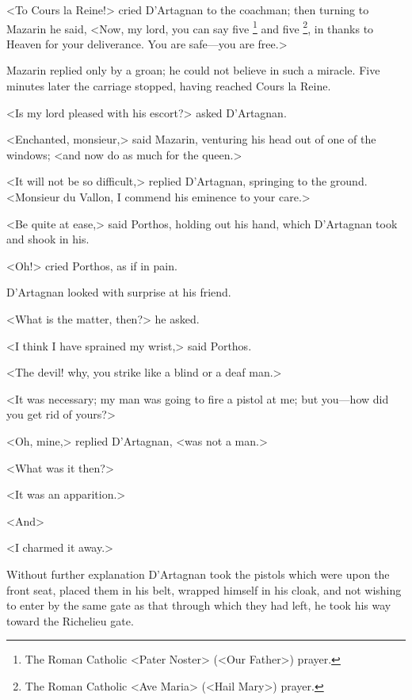 <To Cours la Reine!> cried D'Artagnan to the coachman; then turning to Mazarin he said, <Now, my lord, you can say five \footnote{The Roman Catholic <Pater Noster> (<Our Father>) prayer.} and five \footnote{The Roman Catholic <Ave Maria> (<Hail Mary>) prayer.}, in thanks to Heaven for your deliverance. You are safe—you are free.>

Mazarin replied only by a groan; he could not believe in such a miracle. Five minutes later the carriage stopped, having reached Cours la Reine.

<Is my lord pleased with his escort?> asked D'Artagnan.

<Enchanted, monsieur,> said Mazarin, venturing his head out of one of the windows; <and now do as much for the queen.>

<It will not be so difficult,> replied D'Artagnan, springing to the ground. <Monsieur du Vallon, I commend his eminence to your care.>

<Be quite at ease,> said Porthos, holding out his hand, which D'Artagnan took and shook in his.

<Oh!> cried Porthos, as if in pain.

D'Artagnan looked with surprise at his friend.

<What is the matter, then?> he asked.

<I think I have sprained my wrist,> said Porthos.

<The devil! why, you strike like a blind or a deaf man.>

<It was necessary; my man was going to fire a pistol at me; but you—how did you get rid of yours?>

<Oh, mine,> replied D'Artagnan, <was not a man.>

<What was it then?>

<It was an apparition.>

<And\longdash>

<I charmed it away.>

Without further explanation D'Artagnan took the pistols which were upon the front seat, placed them in his belt, wrapped himself in his cloak, and not wishing to enter by the same gate as that through which they had left, he took his way toward the Richelieu gate. 